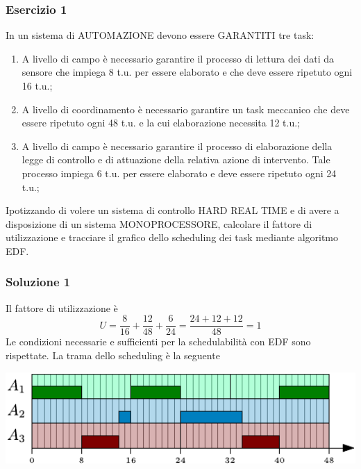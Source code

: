 \documentclass[10pt, letterpaper]{report}
\begin{document}
\subsubsection{Esercizio 1}
In un sistema di AUTOMAZIONE devono essere GARANTITI tre task:\begin{enumerate}
    \item A livello di campo è necessario garantire il processo di lettura dei dati da sensore
che impiega 8 t.u. per essere elaborato e che deve essere ripetuto ogni 16 t.u.;
\item A livello di coordinamento è necessario garantire un task meccanico che deve
essere ripetuto ogni 48 t.u. e la cui elaborazione necessita 12 t.u.;
\item A livello di campo è necessario garantire il processo di elaborazione della legge di
controllo e di attuazione della relativa azione di intervento. Tale processo impiega 6
t.u. per essere elaborato e deve essere ripetuto ogni 24 t.u.;
\end{enumerate}
Ipotizzando di volere un sistema di controllo HARD REAL TIME e di avere a disposizione di
un sistema MONOPROCESSORE, calcolare il fattore di utilizzazione e tracciare il grafico dello
scheduling dei task mediante algoritmo EDF.\subsubsection{Soluzione 1}
Il fattore di utilizzazione è 
$$U=\frac{8}{16}+\frac{12}{48}+\frac{6}{24}=\frac{24+12+12}{48}=1 $$
Le condizioni necessarie e sufficienti per la schedulabilità con EDF sono rispettate.\acc 
La trama dello scheduling è la seguente\begin{center}
    \includegraphics[width=1\textwidth ]{images/esercizioEsame1.pdf}
\end{center}
\end{document}

